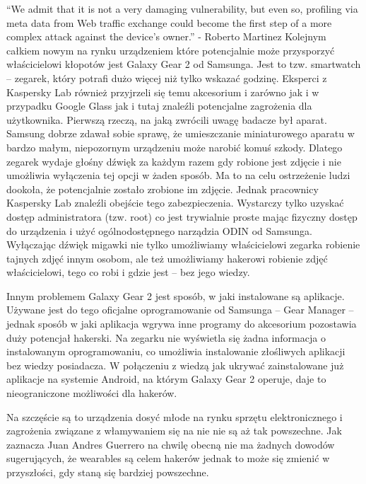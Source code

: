 \documentclass[brudnopis]{xmgr}
\begin{document}
“We admit that it is not a very damaging vulnerability, but even so, profiling via meta data from Web traffic exchange could become the first step of a more complex attack against the device’s owner.” - Roberto Martinez
Kolejnym całkiem nowym na rynku urządzeniem które potencjalnie może przysporzyć właścicielowi kłopotów jest Galaxy Gear 2 od Samsunga. Jest to tzw. smartwatch – zegarek, który potrafi dużo więcej niż tylko wskazać godzinę. Eksperci z Kaspersky Lab również przyjrzeli się temu akcesorium i zarówno jak i w przypadku Google Glass jak i tutaj znaleźli potencjalne zagrożenia dla użytkownika. Pierwszą rzeczą, na jaką zwrócili uwagę badacze był aparat. Samsung dobrze zdawał sobie sprawę, że umieszczanie miniaturowego aparatu w bardzo małym, niepozornym urządzeniu może narobić komuś szkody. Dlatego zegarek wydaje głośny dźwięk za każdym razem gdy robione jest zdjęcie i nie umożliwia wyłączenia tej opcji w żaden sposób. Ma to na celu ostrzeżenie ludzi dookoła, że potencjalnie zostało zrobione im zdjęcie. Jednak pracownicy Kaspersky Lab znaleźli obejście tego zabezpieczenia. Wystarczy tylko uzyskać dostęp administratora (tzw. root) co jest trywialnie proste mając fizyczny dostęp do urządzenia i użyć ogólnodostępnego narządzia ODIN od Samsunga. Wyłączając dźwięk migawki nie tylko umożliwiamy właścicielowi zegarka robienie tajnych zdjęć innym osobom, ale też umożliwiamy hakerowi robienie zdjęć właścicielowi, tego co robi i gdzie jest – bez jego wiedzy.

Innym problemem Galaxy Gear 2 jest sposób, w jaki instalowane są aplikacje. Używane jest do tego oficjalne oprogramowanie od Samsunga – Gear Manager – jednak sposób w jaki aplikacja wgrywa inne programy do akcesorium pozostawia duży potencjał hakerski. Na zegarku nie wyświetla się żadna informacja o instalowanym oprogramowaniu, co umożliwia instalowanie złośliwych aplikacji bez wiedzy posiadacza. W połączeniu z wiedzą jak ukrywać zainstalowane już aplikacje na systemie Android, na którym Galaxy Gear 2 operuje, daje to nieograniczone możliwości dla hakerów.

Na szczęście są to urządzenia dosyć młode na rynku sprzętu elektronicznego i zagrożenia związane z włamywaniem się na nie nie są aż tak powszechne. Jak zaznacza Juan Andres Guerrero na chwilę obecną nie ma żadnych dowodów sugerujących, że wearables są celem hakerów jednak to może się zmienić w przyszłości, gdy staną się bardziej powszechne.
\end{document}
